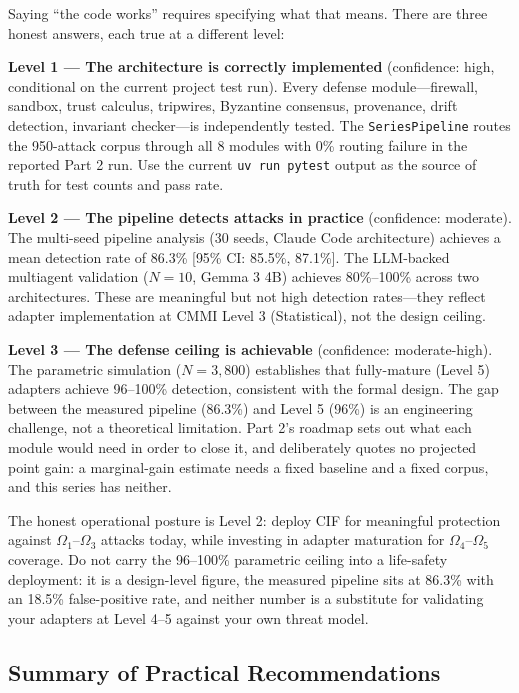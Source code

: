 \documentclass[
]{article}
\begin{document}
Saying ``the code works'' requires specifying what that means. There are
three honest answers, each true at a different level:

\textbf{Level 1 --- The architecture is correctly implemented}
(confidence: high, conditional on the current project test run). Every
defense module---firewall, sandbox, trust calculus, tripwires, Byzantine
consensus, provenance, drift detection, invariant checker---is
independently tested. The \texttt{SeriesPipeline} routes the 950-attack
corpus through all 8 modules with 0\% routing failure in the reported
Part 2 run. Use the current \texttt{uv\ run\ pytest} output as the
source of truth for test counts and pass rate.

\textbf{Level 2 --- The pipeline detects attacks in practice}
(confidence: moderate). The multi-seed pipeline analysis (30 seeds,
Claude Code architecture) achieves a mean detection rate of 86.3\%
{[}95\% CI: 85.5\%, 87.1\%{]}. The LLM-backed multiagent validation
(\(N=10\), Gemma 3 4B) achieves 80\%--100\% across two architectures.
These are meaningful but not high detection rates---they reflect adapter
implementation at CMMI Level 3 (Statistical), not the design ceiling.

\textbf{Level 3 --- The defense ceiling is achievable} (confidence:
moderate-high). The parametric simulation (\(N=3{,}800\)) establishes
that fully-mature (Level 5) adapters achieve 96--100\% detection,
consistent with the formal design. The gap between the measured pipeline
(86.3\%) and Level 5 (96\%) is an engineering challenge, not a
theoretical limitation. Part 2's roadmap sets out what each module would
need in order to close it, and deliberately quotes no projected point
gain: a marginal-gain estimate needs a fixed baseline and a fixed
corpus, and this series has neither.

The honest operational posture is Level 2: deploy CIF for meaningful
protection against \(\Omega_1\)--\(\Omega_3\) attacks today, while
investing in adapter maturation for \(\Omega_4\)--\(\Omega_5\) coverage.
Do not carry the 96--100\% parametric ceiling into a life-safety
deployment: it is a design-level figure, the measured pipeline sits at
86.3\% with an 18.5\% false-positive rate, and neither number is a
substitute for validating your adapters at Level 4--5 against your own
threat model.

\subsection{Summary of Practical
Recommendations}\label{summary-of-practical-recommendations}
\end{document}
